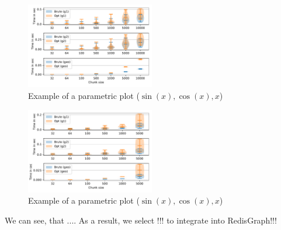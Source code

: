 \begin{figure}[h]
\centering
\includegraphics[width=0.5\textwidth]{data/raw/gohierarchy.pdf}
\caption{Example of a parametric plot ($\sin (x), \cos(x), x$)}
\end{figure}


\begin{figure}[h]
\centering
\includegraphics[width=0.5\textwidth]{data/raw/pathways.pdf}
\caption{Example of a parametric plot ($\sin (x), \cos(x), x$)}
\end{figure}


We can see, that ....
As a result, we select !!! to integrate into RedisGraph!!!
